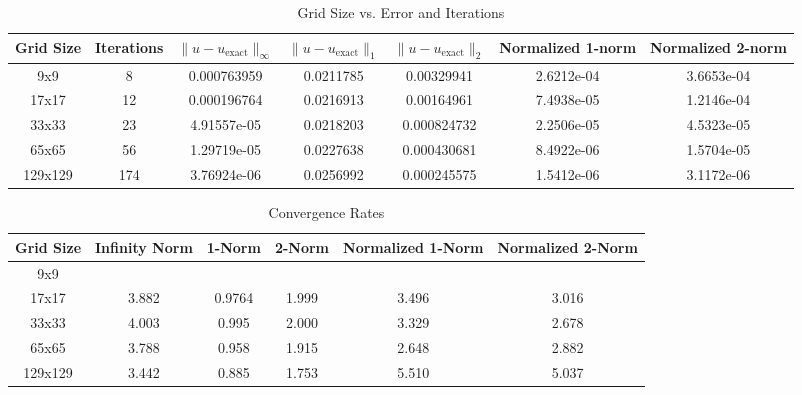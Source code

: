 \begin{table}[h!]
\hspace{-2cm}\begin{tabular}{|c|c|c|c|c|c|c|}
\hline
\textbf{Grid Size} & \textbf{Iterations} & \textbf{$\|u-u_{\text{exact}}\|_{\infty}$} & \textbf{$\|u-u_{\text{exact}}\|_1$} & \textbf{$\|u-u_{\text{exact}}\|_2$} & \textbf{Normalized 1-norm} & \textbf{Normalized 2-norm} \\ \hline
9x9     & 8   & 0.000763959 & 0.0211785 & 0.00329941 & 2.6212e-04 & 3.6653e-04 \\ \hline
17x17   & 12  & 0.000196764 & 0.0216913 & 0.00164961 & 7.4938e-05 & 1.2146e-04 \\ \hline
33x33   & 23  & 4.91557e-05 & 0.0218203 & 0.000824732 & 2.2506e-05 & 4.5323e-05 \\ \hline
65x65   & 56  & 1.29719e-05 & 0.0227638 & 0.000430681 & 8.4922e-06 & 1.5704e-05 \\ \hline
129x129 & 174 & 3.76924e-06 & 0.0256992 & 0.000245575 & 1.5412e-06 & 3.1172e-06 \\ \hline
\end{tabular}
\caption{Grid Size vs. Error and Iterations}
\label{errors}
\end{table}

\begin{table}[h!]
\centering
\begin{tabular}{|c|c|c|c|c|c|}
\hline
\textbf{Grid Size} & \textbf{Infinity Norm} & \textbf{1-Norm} & \textbf{2-Norm} & \textbf{Normalized 1-Norm} & \textbf{Normalized 2-Norm} \\ \hline
9x9     &        &        &        &        &        \\ \hline
17x17   & 3.882 & 0.9764 & 1.999 & 3.496 & 3.016 \\ \hline
33x33   & 4.003 & 0.995 & 2.000 & 3.329 & 2.678 \\ \hline
65x65   & 3.788 & 0.958 & 1.915 & 2.648 & 2.882 \\ \hline
129x129 & 3.442 & 0.885 & 1.753 & 5.510 & 5.037 \\ \hline
\end{tabular}
\caption{Convergence Rates}
\label{rates}
\end{table}






\FloatBarrier

